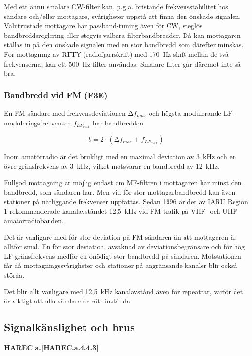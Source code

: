 Med ett ännu smalare CW-filter kan, p.g.a. bristande
frekvensstabilitet hos sändare och/eller mottagare, svårigheter
uppstå att finna den önskade signalen. Välutrustade mottagare har
passband-tuning även för CW, steglös bandbreddsreglering eller stegvis
valbara filterbandbredder. Då kan mottagaren ställas in på den önskade
signalen med en stor bandbredd som därefter minskas.  För mottagning
av RTTY (radiofjärrskrift) med 170~Hz skift mellan de två
frekvenserna, kan ett 500~Hz-filter användas. Smalare filter går
däremot inte så bra.

\subsubsection{Bandbredd vid FM (F3E)}

En FM-sändare med frekvensdeviationen \(∆f_{max}\) och högsta
modulerande LF-moduleringsfrekvensen \(f_{LF_{max}}\) har bandbredden

\[ b = 2 \cdot (∆f_{max} + f_{LF_{max}}) \]

Inom amatörradio är det brukligt med en maximal deviation av 3~kHz och
en övre gränsfrekvens av 3~kHz, vilket motsvarar en bandbredd av 12~kHz.

Fullgod mottagning är möjlig endast om MF-filtren i mottagaren har
minst den bandbredd, som sändaren har. Men vid för stor
mottagarbandbredd kan även stationer på närliggande frekvenser
uppfattas. Sedan 1996 är det av IARU Region 1 rekommenderade
kanalavståndet 12,5~kHz vid FM-trafik på VHF- och
UHF-amatörradiobanden.

Det är vanligare med för stor deviation på FM-sändaren än att
mottagaren är alltför smal. En för stor deviation, avsaknad av
deviationsbegränsare och för hög LF-gränsfrekvens medför en onödigt
stor bandbredd på sändaren. Motstationen får då mottagningssvårigheter
och stationer på angränsande kanaler blir också störda.

Det blir allt vanligare med 12,5~kHz kanalavstånd även för repeatrar,
varför det är viktigt att alla sändare är rätt inställda.

\subsection{Signalkänslighet och brus}
\textbf{HAREC a.\ref{HAREC.a.4.4.3}\label{myHAREC.a.4.4.3}}

